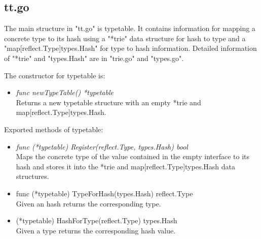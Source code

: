 \subsection{tt.go} 

The main structure in "tt.go" is typetable. It contains information for mapping a concrete type to its hash using a "*trie" data structure for hash to type and a "map[reflect.Type]types.Hash" for type to hash information. Detailed information of "*trie" and "types.Hash" are in "trie.go" and "types.go".

The constructor for typetable is:

\begin{itemize}

	\item \emph{func newTypeTable() *typetable}\\
	Returns a new typetable structure with an empty *trie and map[reflect.Type]types.Hash.
	
\end{itemize}

Exported methods of typetable:

\begin{itemize}

	\item \emph{func (*typetable) Register(reflect.Type, types.Hash) bool}\\
	Maps the concrete type of the value contained in the empty interface to its hash and stores it into the *trie and map[reflect.Type]types.Hash data structures.
	
	\item func (*typetable) TypeForHash(types.Hash) reflect.Type\\
	Given an hash returns the corresponding type.
	
	\item (*typetable) HashForType(reflect.Type) types.Hash\\
	Given a type returns the corresponding hash value.
	
\end{itemize}
